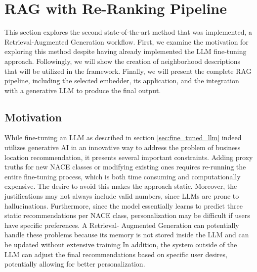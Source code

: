 \section{RAG with Re-Ranking Pipeline}
\label{sec:rag}

This section explores the second state-of-the-art method that was implemented, a Retrieval-Augmented Generation workflow. First, we examine the motivation for exploring this method despite having already implemented the LLM fine-tuning approach. Followingly, we will show the creation of neighborhood descriptions that will be utilized in the framework. Finally, we will present the complete RAG pipeline, including the selected embedder, its application, and the integration with a generative LLM to produce the final output.



\subsection{Motivation}

While fine-tuning an LLM as described in section \ref{sec:fine_tuned_llm} indeed utilizes generative AI in an innovative way to address the problem of business location recommendation, it presents several important constraints. Adding proxy truths for new NACE classes or modifying existing ones requires re-running the entire fine-tuning process, which is both time consuming and computationally expensive. The desire to avoid this makes the approach static. Moreover, the justifications may not always include valid numbers, since LLMs are prone to hallucinations. Furthermore, since the model essentially learns to predict three static recommendations per NACE class, personalization may be difficult if users have specific preferences. A Retrieval-
Augmented Generation can potentially handle these problems because its memory is not stored inside the LLM and can be updated without extensive training In addition, the system outside of the LLM can adjust the final recommendations based on specific user desires, potentially allowing for better personalization.



